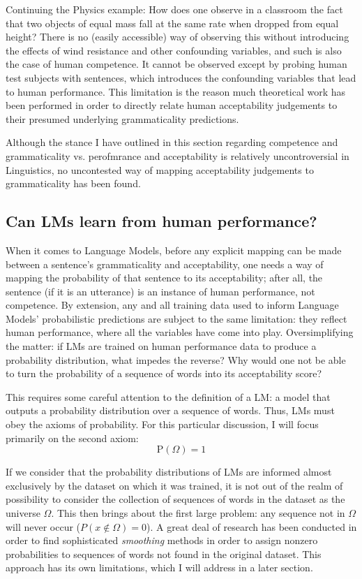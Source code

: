 Continuing the Physics example: How does one observe in a classroom the fact that two objects of equal mass fall at the same rate when dropped from equal height?  There is no (easily accessible) way of observing this without introducing the effects of wind resistance and other confounding variables, and such is also the case of human competence.  It cannot be observed except by probing human test subjects with sentences, which introduces the confounding variables that lead to human performance.  This limitation is the reason much theoretical work has been performed in order to directly relate human acceptability judgements to their presumed underlying grammaticality predictions.

Although the stance I have outlined in this section regarding competence and grammaticality vs. perofmrance and acceptability is relatively uncontroversial in Linguistics, no uncontested way of mapping acceptability judgements to grammaticality has been found.

\subsection{Can LMs learn from human performance?}
When it comes to Language Models, before any explicit mapping can be made between a sentence's grammaticality and acceptability, one needs a way of mapping the probability of that sentence to its acceptability; after all, the sentence (if it is an utterance) is an instance of human performance, not competence.  By extension, any and all training data used to inform Language Models' probabilistic predictions are subject to the same limitation: they reflect human performance, where all the variables have come into play.  Oversimplifying the matter: if LMs are trained on human performance data to produce a probability distribution, what impedes the reverse?  Why would one not be able to turn the probability of a sequence of words into its acceptability score?

This requires some careful attention to the definition of a LM: a model that outputs a probability distribution over a sequence of words.  Thus, LMs must obey the axioms of probability.  For this particular discussion, I will focus primarily on the second axiom: $$\mathrm{P}(\Omega)=1$$

If we consider that the probability distributions of LMs are informed almost exclusively by the dataset on which it was trained, it is not out of the realm of possibility to consider the collection of sequences of words in the dataset as the universe $\Omega$.  This then brings about the first large problem: any sequence not in $\Omega$ will never occur ($P(x \notin \Omega) = 0$).  A great deal of research has been conducted in order to find sophisticated \textit{smoothing} methods in order to assign nonzero probabilities to sequences of words not found in the original dataset.  This approach has its own limitations, which I will address in a later section.

